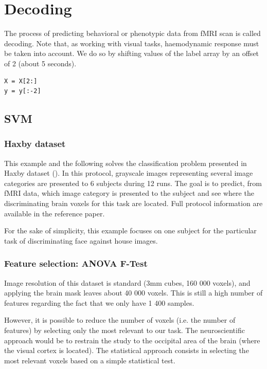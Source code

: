 \documentclass{frontiersSCNS} %
\begin{document}
\section{Decoding}

The process of predicting behavioral or phenotypic data from fMRI scan is
called decoding. Note that, as working with visual tasks, haemodynamic response
must be taken into account. We do so by shifting values of the label
array by an offset of 2 (about 5 seconds).

\begin{lstlisting}
X = X[2:]
y = y[:-2]
\end{lstlisting}

\subsection{SVM}

\subsubsection{Haxby dataset}

This example and the following solves the classification problem presented in
Haxby dataset (\cite{haxby2001}). In this protocol, grayscale images
representing several image categories are presented to 6 subjects during 12
runs. The goal is to predict, from fMRI data, which image category is presented
to the subject and see where the discriminating brain voxels for this task are
located. Full protocol information are available in the reference paper.

For the sake of simplicity, this example focuses on one subject for the
particular task of discriminating face against house images.

\subsubsection{Feature selection: ANOVA F-Test}

Image resolution of this dataset is standard (3mm cubes, 160 000 voxels),
and applying the brain mask leaves about 40 000 voxels. This is still a
high number of features regarding the fact that we only have 1 400 samples.

However, it is possible to reduce the number of voxels (i.e. the number of
features) by selecting only the most relevant to our task. The neuroscientific
approach would be to restrain the study to the occipital area of the brain
(where the visual cortex is located). The statistical approach consists in
selecting the most relevant voxels based on a simple statistical test.
\end{document}
